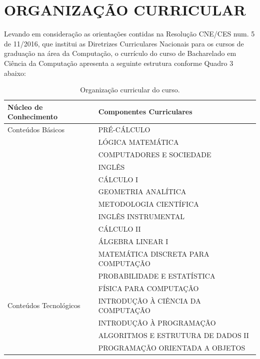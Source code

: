 \chapter{ORGANIZAÇÃO CURRICULAR}

Levando em consideração as orientações contidas na Resolução CNE/CES num. 5 de 11/2016, que institui as Diretrizes Curriculares Nacionais para os cursos de graduação na área da Computação, o currículo do curso de Bacharelado em Ciência da Computação apresenta a seguinte estrutura conforme Quadro 3 abaixo:

\begin{center}
  \begin{scriptsize}
    \begin{longtable}{@{}lp{10cm}}
      \caption{\label{quadro:organizacao-curricular-do-curso}Organização curricular do curso.}\\
    \toprule
    \textbf{Núcleo de Conhecimento} & \textbf{Componentes Curriculares} \\ 
    \midrule
    Conteúdos Básicos & PRÉ-CÁLCULO\\ 
                      & LÓGICA MATEMÁTICA \\
                      & COMPUTADORES E SOCIEDADE \\
                      & INGLÊS  \\
                      & CÁLCULO I \\
                      & GEOMETRIA ANALÍTICA \\
                      & METODOLOGIA CIENTÍFICA \\
                      & INGLÊS INSTRUMENTAL \\
                      & CÁLCULO II \\
                      & ÁLGEBRA LINEAR I \\
                      & MATEMÁTICA DISCRETA PARA COMPUTAÇÃO \\
                      & PROBABILIDADE E ESTATÍSTICA \\
                      & FÍSICA PARA COMPUTAÇÃO \\ \midrule
    Conteúdos Tecnológicos  & INTRODUÇÃO À CIÊNCIA DA COMPUTAÇÃO \\ 
                            & INTRODUÇÃO À PROGRAMAÇÃO \\
                            & ALGORITMOS E ESTRUTURA DE DADOS II \\
                            & PROGRAMAÇÃO ORIENTADA A OBJETOS \\

\end{longtable}
\end{scriptsize}
\end{center}
